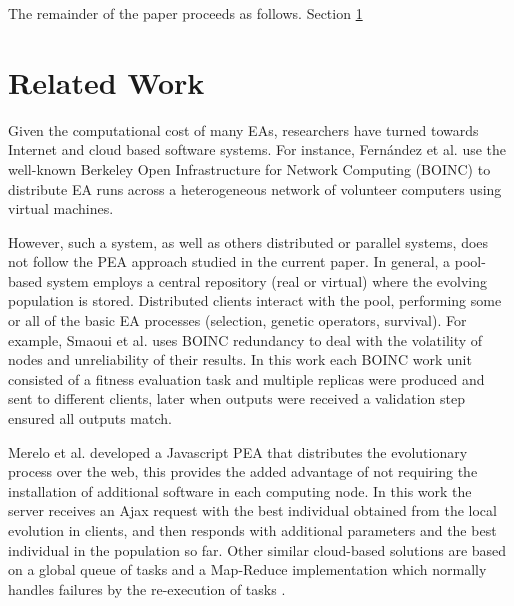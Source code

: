 \documentclass{sig-alternate}
\begin{document}
The remainder of the paper proceeds as follows. Section \ref{sec:work} 

\section{Related Work}
\label{sec:work}
Given the computational cost of many EAs, researchers have turned towards Internet and cloud based software systems.
For instance, Fern\'andez et al. \cite{nc}%
use the well-known Berkeley Open Infrastructure for Network Computing (BOINC) to distribute EA runs across a
heterogeneous network of volunteer computers using virtual machines.

However, such a system, as well as others distributed or parallel systems, does not follow the PEA approach studied in the current paper.
In general, a pool-based system employs a central repository (real or virtual) where the evolving population is stored.
Distributed clients interact with the pool, performing some or all of the basic EA processes (selection, genetic operators, survival). 
For example, Smaoui et al. \cite{FekiNG09} uses BOINC redundancy
to deal with the volatility of nodes and unreliability of their results. 
In this work each BOINC work unit consisted of a fitness evaluation task and
multiple replicas were produced and sent to different clients, later when 
outputs were received a validation step ensured all outputs match.

Merelo et al. \cite{JSON} developed a Javascript PEA that distributes the evolutionary process over the web,
this provides the added advantage of not requiring the installation of additional software in each computing node. 
In this work the server receives an Ajax request with the best individual 
obtained from the local evolution in clients, and then responds with 
additional parameters and the best individual in the population so far. 
Other similar cloud-based solutions are based on a global queue of tasks and a Map-Reduce 
implementation which normally handles failures by the re-execution of  tasks \cite{fazenda2012,di2013towards,FlexGP}. 

\end{document}
